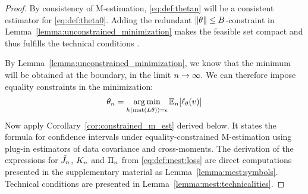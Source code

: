 \begin{proof}
    By consistency of M-estimation, \eqref{eq:def:thetan} will be a consistent estimator for \eqref{eq:def:theta0}. Adding the redundant $\lVert\theta\rVert \leq B$-constraint in Lemma~\ref{lemma:unconstrained_minimization} makes the feasible set compact and thus fulfills the technical conditions \citep[Theorem 12.2]{wooldridge_econometric_2010}.

    By Lemma~\ref{lemma:unconstrained_minimization}, we know that the minimum will be obtained at the boundary, in the limit $n \to \infty$. We can therefore impose equality constraints in the minimization:
    \begin{align}
        \theta_n = \operatorname*{arg\,min}_{
            h(\operatorname*{mat}(L\theta)) = \epsilon }
        \mathbb{E}_n[\ell_{\theta}(v) ]
    \end{align}
    Now apply Corollary~\ref{cor:constrained_m_est} derived below. It states the formula for confidence intervals under equality-constrained M-estimation using plug-in estimators of data covariance and cross-moments. The derivation of the expressions for $\tilde {J_n}$, $K_n$ and $\Pi_n$ from \eqref{eq:def:mest:loss} are direct computations presented in the supplementary material as Lemma~\ref{lemma:mest:symbols}. Technical conditions are presented in Lemma~\ref{lemma:mest:technicalities}.
\end{proof}

